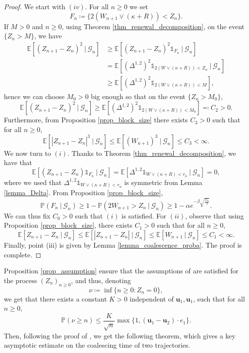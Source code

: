 \documentclass[a4paper, 11pt]{article}
\theoremstyle{plain}
\theoremstyle{definition}
\newcommand{\E}{\mathbb{E}}
\renewcommand{\P}{\mathbb{P}}
\numberwithin{equation}{section}
\begin{document}
\begin{proof}
    We start with $(iv)$. For all $n\geq0$ we set
        \[F_n\coloneqq\{2(W_{n+1}\vee(\kappa+R))<Z_n\}.\]
    If $M>0$ and $n\geq 0$, using Theorem \ref{thm_renewal_decomposition}, on the event $\{Z_n>M\}$, we have
        \begin{equation*}
            \begin{split}
                \E[(Z_{n+1}-Z_n)^2~|~\mathcal G_n]&\geq\E[(Z_{n+1}-Z_n)^2\mathds 1_{F_n}~|~\mathcal G_n]\\
                &=\E[(\Delta^{1, 2})^2\mathds 1_{2(W\vee(\kappa+R))<Z_n}~|~\mathcal G_n]\\
                &\geq\E[(\Delta^{1, 2})^2\mathds 1_{2(W\vee(\kappa+R))<M}],
            \end{split}
        \end{equation*}
    hence we can choose $M_0>0$ big enough so that on the event $\{Z_n>M_0\}$,
        \[\E[(Z_{n+1}-Z_n)^2~|~\mathcal G_n]\geq\E[(\Delta^{1, 2})^2\mathds 1_{2(W\vee(\kappa+R))<M_0}]\eqqcolon C_2>0.\]
    Furthermore, from Proposition \ref{prop_block_size} there exists $C_3>0$ such that for all $n\geq 0$,
        \[\E[|Z_{n+1}-Z_n|^3~|~\mathcal G_n]\leq\E[(W_{n+1})^3~|~\mathcal G_n]\leq C_3<\infty.\]
    We now turn to $(i)$. Thanks to Theorem \ref{thm_renewal_decomposition}, we have that
        \[\E[(Z_{n+1}-Z_n)\mathds 1_{F_n}~|~\mathcal G_n]=\E[\Delta^{1, 2}\mathds 1_{W\vee(\kappa+R)<r_n}~|~\mathcal G_n]=0,\]
    where we used that $\Delta^{1, 2}\mathds 1_{W\vee(\kappa+R)<r_n}$ is symmetric from Lemma \ref{lemma_Delta}. From Proposition \ref{prop_block_size},
        \[\P(F_n~|~\mathcal G_n)\geq 1-\P(2W_{n+1}>Z_n~|~\mathcal G_n)\geq 1-\alpha e^{-\beta\sqrt{\frac{Z_n}{2}}}.\]
    We can thus fix $C_0>0$ such that $(i)$ is satisfied. For $(ii)$, observe that using Proposition \ref{prop_block_size}, there exists $C_1>0$ such that for all $n\geq 0$,
        \[\E[Z_{n+1}-Z_n~|~\mathcal G_n]\leq\E[|Z_{n+1}-Z_n|~|~\mathcal G_n]\leq \E[W_{n+1}~|~\mathcal G_n]\leq C_1<\infty.\]
    Finally, point (iii) is given by Lemma \ref{lemma_coalescence_proba}. The proof is complete.
\end{proof}


Proposition \ref{prop_assumption} ensure that the assumptions of \cite[Corollary 5.6]{Dsf2d} are satisfied for the process $(Z_n)_{n\geq 0}$, and thus, denoting
    \[\nu\coloneqq\inf\{n\geq 0:Z_n=0\},\]
we get that there exists a constant $ K>0$ independent of $\mathbf u_1,\mathbf u_1$, such that for all $n\geq 0$,
    \[\P(\nu\geq n)\leq\frac{K}{\sqrt n}\max\{1, (\mathbf u_1-\mathbf u_2)\cdot e_1\}.\]
Then, following the proof of \cite[Theorem 5.1]{Dsf2d}, we get the following theorem, which gives a key asymptotic estimate on the coalescing time of two trajectories.
\end{document}
